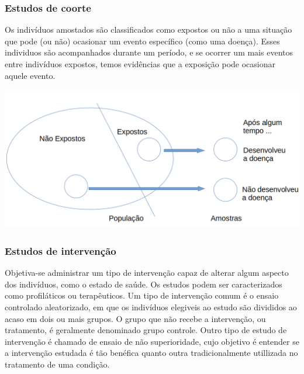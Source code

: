 \documentclass[11pt]{beamer}
\begin{document}
\begin{frame}
\frametitle{Estudos de coorte}
Os indivíduos amostados são classificados como expostos ou não a uma situação que pode (ou não) ocasionar um evento específico (como uma doença). Esses individuos são acompanhados durante um período, e se ocorrer um mais eventos entre indivíduos expostos, temos evidências que a exposição pode ocasionar aquele evento.
\begin{center}\includegraphics[width=0.8\linewidth]{figs/coorte} \end{center}
\end{frame}

\begin{frame}
\frametitle{Estudos de intervenção}
Objetiva-se administrar um tipo de intervenção capaz de alterar algum aspecto dos indivíduos, como o estado de saúde. Os estudos podem ser caracterizados como profiláticos ou terapêuticos. Um tipo de intervenção comum é o ensaio controlado aleatorizado, em que os indivíduos elegiveis ao estudo são divididos ao acaso em dois ou mais grupos. O grupo que não recebe a intervenção, ou tratamento, é geralmente denominado grupo controle. Outro tipo de estudo de intervenção é chamado de ensaio de não superioridade, cujo objetivo é entender se a intervenção estudada é tão benéfica quanto outra tradicionalmente utillizada no tratamento de uma condição.
\end{frame}
\end{document}
